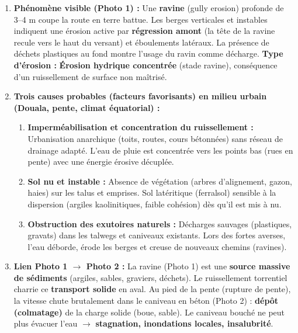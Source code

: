 \documentclass[11pt]{article}
\begin{document}
\begin{corrige}
\begin{enumerate}
    \item \textbf{Phénomène visible (Photo 1) :} Une \textbf{ravine} (gully erosion) profonde de 3--4 m coupe la route en terre battue. Les berges verticales et instables indiquent une érosion active par \textbf{régression amont} (la tête de la ravine recule vers le haut du versant) et éboulements latéraux. La présence de déchets plastiques au fond montre l'usage du ravin comme décharge.
    \textbf{Type d'érosion :} \textbf{Érosion hydrique concentrée} (stade ravine), conséquence d'un ruissellement de surface non maîtrisé.

    \item \textbf{Trois causes probables (facteurs favorisants) en milieu urbain (Douala, pente, climat équatorial) :}
    \begin{enumerate}
        \item \textbf{Imperméabilisation et concentration du ruissellement :} Urbanisation anarchique (toits, routes, cours bétonnées) sans réseau de drainage adapté. L'eau de pluie est concentrée vers les points bas (rues en pente) avec une énergie érosive décuplée.
        \item \textbf{Sol nu et instable :} Absence de végétation (arbres d'alignement, gazon, haies) sur les talus et emprises. Sol latéritique (ferralsol) sensible à la dispersion (argiles kaolinitiques, faible cohésion) dès qu'il est mis à nu.
        \item \textbf{Obstruction des exutoires naturels :} Décharges sauvages (plastiques, gravats) dans les talwegs et caniveaux existants. Lors des fortes averses, l'eau déborde, érode les berges et creuse de nouveaux chemins (ravines).
    \end{enumerate}

    \item \textbf{Lien Photo 1 $\rightarrow$ Photo 2 :} La ravine (Photo 1) est une \textbf{source massive de sédiments} (argiles, sables, graviers, déchets). Le ruissellement torrentiel charrie ce \textbf{transport solide} en aval. Au pied de la pente (rupture de pente), la vitesse chute brutalement dans le caniveau en béton (Photo 2) : \textbf{dépôt (colmatage)} de la charge solide (boue, sable). Le caniveau bouché ne peut plus évacuer l'eau $\rightarrow$ \textbf{stagnation, inondations locales, insalubrité}.


\end{enumerate}
\end{corrige}
\end{document}
